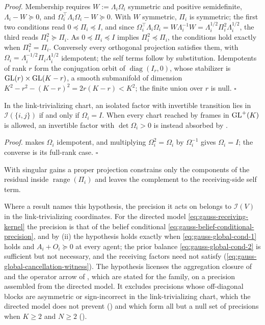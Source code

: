 \noindent\emph{Proof.}
Membership requires \(W:=\Lambda_i\Omega_i\) symmetric and positive
semidefinite, \(\Lambda_i-W\succeq0\), and \(\Omega_i^\top\Lambda_i\Omega_i-W\succeq0\).
With \(W\) symmetric, \(\Pi_i\) is symmetric; the first two conditions read
\(0\preceq \Pi_i\preceq I\), and since
\(\Omega_i^\top\Lambda_i\Omega_i=W\Lambda_i^{-1}W=\Lambda_i^{1/2}\Pi_i^2\Lambda_i^{1/2}\),
the third reads \(\Pi_i^2\succeq \Pi_i\). As \(0\preceq \Pi_i\preceq I\) implies
\(\Pi_i^2\preceq \Pi_i\), the conditions hold exactly when \(\Pi_i^2=\Pi_i\). Conversely every
orthogonal projection satisfies them, with \(\Omega_i=\Lambda_i^{-1/2}\Pi_i\Lambda_i^{1/2}\)
idempotent; the self terms follow by substitution. Idempotents of rank \(r\)
form the conjugation orbit of \(\operatorname{diag}(I_r,0)\), whose stabilizer
is \(\mathrm{GL}(r)\times\mathrm{GL}(K-r)\), a smooth submanifold of dimension
\(K^2-r^2-(K-r)^2=2r(K-r)<K^2\); the finite union over \(r\) is null.
\(\square\)

In the link-trivializing chart, an isolated factor with invertible transition
lies in \(\mathcal I(\{i,j\})\) if and only if \(\Omega_i=I\). When every chart
reached by frames in \(\mathrm{GL}^+(K)\) is allowed, an invertible factor with
\(\det\Omega_i>0\) is instead absorbed by .

\noindent\emph{Proof.}
 makes \(\Omega_i\) idempotent,
and multiplying \(\Omega_i^2=\Omega_i\) by \(\Omega_i^{-1}\) gives \(\Omega_i=I\);
the converse is its full-rank case. \(\square\)

With singular gains a proper projection constrains only the components of the
residual inside \(\operatorname{range}(\Pi_i)\) and leaves the complement to the
receiving-side self term.

Where a result names this hypothesis, the precision it acts on belongs to
\(\mathcal I(V)\) in the link-trivializing coordinates. For the directed model
\eqref{eq:gauss-receiving-kernel} the precision is that of the belief
conditional \eqref{eq:gauss-belief-conditional-precision}, and by
(ii) the hypothesis holds exactly
when \eqref{eq:gauss-global-cond-1} holds and \(A_i+O_i\succeq0\) at every
agent; the prior balance \eqref{eq:gauss-global-cond-2} is sufficient but not
necessary, and the receiving factors need not satisfy
(\eqref{eq:gauss-global-cancellation-witness}). The hypothesis licenses the
aggregation closure of  and the operator
arrow of , which are stated for the family, on a
precision assembled from the directed model. It excludes precisions whose
off-diagonal blocks are asymmetric or sign-incorrect in the link-trivializing
chart, which the directed model does not prevent
() and which form all but a
null set of precisions when \(K\geq2\) and \(N\geq2\)
().

